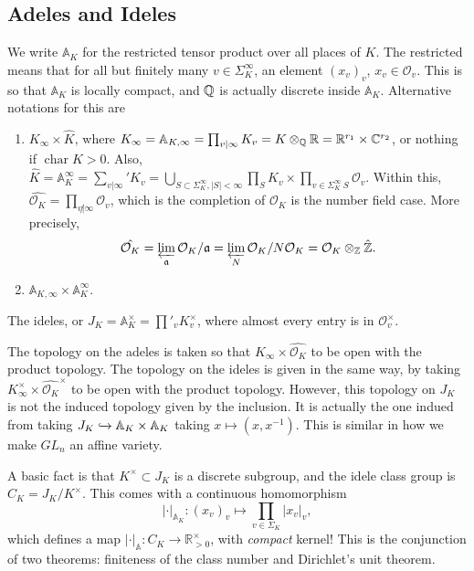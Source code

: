 \subsection{Adeles and Ideles} We write $\mathbb{A}_K$ for the restricted tensor
product over all places of $K$. The restricted means that for all but finitely
many $v \in \Sigma_K^\infty$, an element $(x_v)_v$, $x_v \in \mathcal{O}_v$.
This is so that $\mathbb{A}_K$ is locally compact, and $\mathbb{Q}$ is actually
discrete inside $\mathbb{A}_K$. Alternative notations for this are
\begin{enumerate}[(1)]
  \item $K_\infty \times \hat{K}$, where $K_\infty = \mathbb{A}_{K, \infty} =
    \prod_{v | \infty} K_v = K \otimes_{\mathbb{Q}} \mathbb{R} = \mathbb{R}^{r_1} \times
    \mathbb{C}^{r_2}$, or nothing if $\operatorname{char} K > 0$. Also, $\hat{K} =
    \mathbb{A}_K^\infty = \sum_{v | \infty}' K_v = \bigcup_{S \subset
    \Sigma_K^\infty, |S| < \infty} \prod_S K_v \times \prod_{v \in
    \Sigma_K^\infty \ S} \mathcal{O}_v$.  Within this, $\hat{\mathcal{O}_K} =
    \prod_{v \not | \infty} \mathcal{O}_v$, which is the completion of
    $\mathcal{O}_K$ is the number field case. More precisely, \[
      \hat{\mathcal{O}_K} = \varprojlim_{\mathfrak{a}} \mathcal{O}_K/\mathfrak{a}
      = \varprojlim_{N} \mathcal{O}_K/N\mathcal{O}_K = \mathcal{O}_K
      \otimes_{\mathbb{Z}} \hat{\mathbb{Z}}. \]
  \item $\mathbb{A}_{K, \infty} \times \mathbb{A}_K^\infty.$
\end{enumerate}
The ideles, or $J_K = \mathbb{A}_K^\times = \prod'_v K_v^\times$, where almost
every entry is in $\mathcal{O}_v^\times$.

The topology on the adeles is taken so that $K_\infty \times
\hat{\mathcal{O}_K}$ to be open with the product topology. The topology on the
ideles is given in the same way, by taking $K_\infty^\times \times
\hat{\mathcal{O}_K}^\times$ to be open with the product topology. However, this
topology on $J_K$ is not the induced topology given by the inclusion. It is
actually the one indued from taking $J_K \xhookrightarrow{} \mathbb{A}_K \times
\mathbb{A}_K$ taking $x \mapsto (x, x^{-1})$. This is similar in how we make
$GL_n$ an affine variety.

A basic fact is that $K^\times \subset J_K$ is a discrete subgroup, and the
idele class group is $C_K = J_K / K^\times$. This comes with a continuous
homomorphism \[ | \cdot |_{\mathbb{A}_K} : (x_v)_v \mapsto \prod_{v \in
\Sigma_K} |x_v|_v, \] which defines a map $| \cdot |_{\mathbb{A}} : C_K
\rightarrow \mathbb{R}^\times_{> 0}$, with \emph{compact} kernel! This is the
conjunction of two theorems: finiteness of the class number and Dirichlet's unit
theorem.

